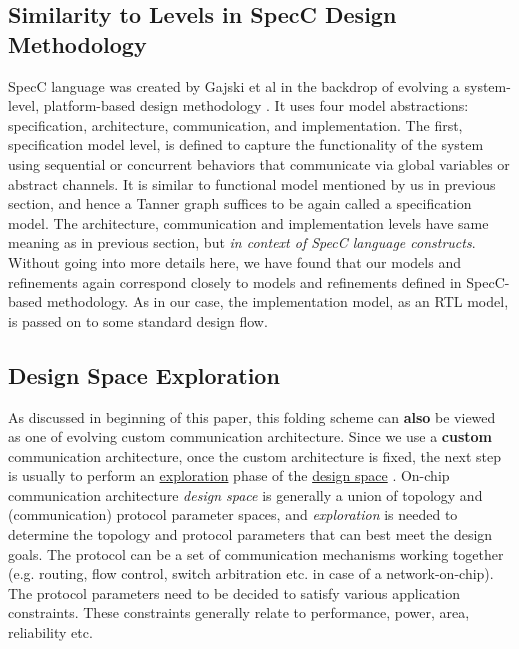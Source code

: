 \documentclass[12pt]{article}
\begin{document}
\subsection{Similarity to Levels in SpecC Design Methodology}
SpecC language was created by Gajski et al in the backdrop of evolving a
system-level, platform-based design methodology \cite{spec_c_methodology}.
It uses four model abstractions: specification, architecture, communication, and
implementation. The first, specification model level, is defined to
capture the functionality of the system using sequential or concurrent
behaviors that communicate via global variables or abstract channels. It is
similar to functional model mentioned by us in
previous section, and hence a Tanner graph suffices to be again
called a specification model. The architecture, communication and
implementation levels have same meaning as in previous section, but
\textit{in context of SpecC language constructs}. Without going into more
details here, we have found that our models and refinements again
correspond closely to models and refinements defined in SpecC-based
methodology. As in our case, the implementation model, as an RTL model, is
passed on to some standard design flow.

\subsection{Design Space Exploration}

As discussed in beginning of this paper, this folding scheme can
\textbf{also} be viewed as one of evolving custom communication architecture.
Since we use a \textbf{custom} communication architecture, once the custom
architecture is fixed, the next step is usually to perform an
\uline{exploration} phase of the \uline{design space} \cite{ocn_book}.
On-chip communication architecture \textit{design space} is generally a
union of topology and (communication) protocol parameter spaces, and
\textit{exploration} is needed to determine the topology and protocol
parameters that can best meet the design goals. The protocol can be a set
of communication mechanisms working together (e.g.  routing, flow control, switch
arbitration etc. in case of a network-on-chip). The protocol parameters
need to be decided to satisfy various application constraints. These
constraints generally relate to performance, power, area, reliability etc.
\end{document}
